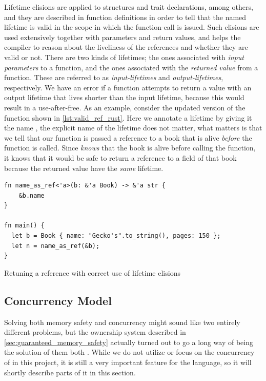 Lifetime elisions are applied to structures and trait declarations, among others, and they are described in function definitions in order to tell {\rust} that the named lifetime is valid in the scope in which the function-call is issued.
Such elisions are used extensively together with parameters and return values, and helps the compiler to reason about the liveliness of the references and whether they are valid or not.
There are two kinds of lifetimes; the ones associated with \emph{input parameters} to a function, and the ones associated with the \emph{returned value} from a function.
These are referred to as \emph{input-lifetimes} and \emph{output-lifetimes}, respectively.
We have an error if a function attempts to return a value with an output lifetime that lives shorter than the input lifetime, because this would result in a use-after-free.
As an example, consider the updated version of the  function shown in \autoref{lst:valid_ref_rust}.
Here we annotate a lifetime by giving it the name , the explicit name of the lifetime does not matter, what matters is that we tell {\rust} that our function is passed a reference to a book that is alive \emph{before} the function is called.
Since {\rust} \emph{knows} that the book is alive before calling the function, it knows that it would be safe to return a reference to a field of that book because the returned value have the \emph{same} lifetime.

\begin{listing}[tb]
\begin{verbatim}
fn name_as_ref<'a>(b: &'a Book) -> &'a str {
    &b.name
}

fn main() {
  let b = Book { name: "Gecko's".to_string(), pages: 150 };
  let n = name_as_ref(&b);
}
\end{verbatim}
\caption{Retuning a reference with correct use of lifetime elisions}
\label{lst:valid_ref_rust}
\end{listing}

\subsection{Concurrency Model} %
\label{ssub:concurrency_model}

Solving both memory safety and concurrency might sound like two entirely different problems, but the ownership system described in \autoref{sec:guaranteed_memory_safety} actually turned out to go a long way of being the solution of them both \cite{web:fearless_concurrency_with_rust}.
While we do not utilize or focus on the concurrency of {\rust} in this project, it is still a very important feature for the language, so it will shortly describe parts of it in this section.


